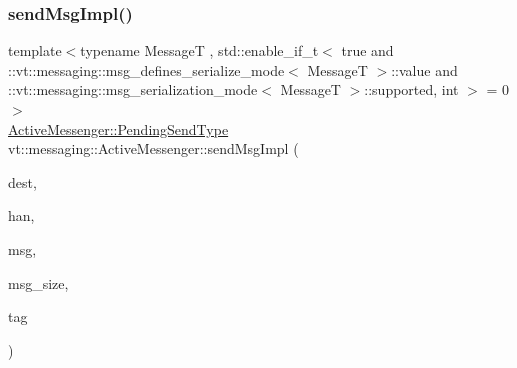 \subsubsection{\texorpdfstring{send\+Msg\+Impl()}{sendMsgImpl()}\hspace{0.1cm}{\footnotesize\ttfamily [3/4]}}
{\footnotesize\ttfamily template$<$typename MessageT , std\+::enable\+\_\+if\+\_\+t$<$ true and \+::vt\+::messaging\+::msg\+\_\+defines\+\_\+serialize\+\_\+mode$<$ Message\+T $>$\+::value and \+::vt\+::messaging\+::msg\+\_\+serialization\+\_\+mode$<$ Message\+T $>$\+::supported, int $>$  = 0$>$ \\
\hyperlink{structvt_1_1messaging_1_1_active_messenger_a3626a6ca76d8ad4ec7c3b47a2c70d3a8}{Active\+Messenger\+::\+Pending\+Send\+Type} vt\+::messaging\+::\+Active\+Messenger\+::send\+Msg\+Impl (\begin{DoxyParamCaption}\item[{\hyperlink{namespacevt_a866da9d0efc19c0a1ce79e9e492f47e2}{Node\+Type}}]{dest,  }\item[{\hyperlink{namespacevt_af64846b57dfcaf104da3ef6967917573}{Handler\+Type}}]{han,  }\item[{\hyperlink{structvt_1_1messaging_1_1_msg_shared_ptr}{Msg\+Shared\+Ptr}$<$ MessageT $>$ \&}]{msg,  }\item[{\hyperlink{namespacevt_aab8d55968084610ce3b17057981e9300}{Byte\+Type}}]{msg\+\_\+size,  }\item[{\hyperlink{namespacevt_a84ab281dae04a52a4b243d6bf62d0e52}{Tag\+Type}}]{tag }\end{DoxyParamCaption})\hspace{0.3cm}{\ttfamily [inline]}}

\mbox{\label{structvt_1_1messaging_1_1_active_messenger_a7f2e8867a9d967eb7f43df7d5c420775}} 
